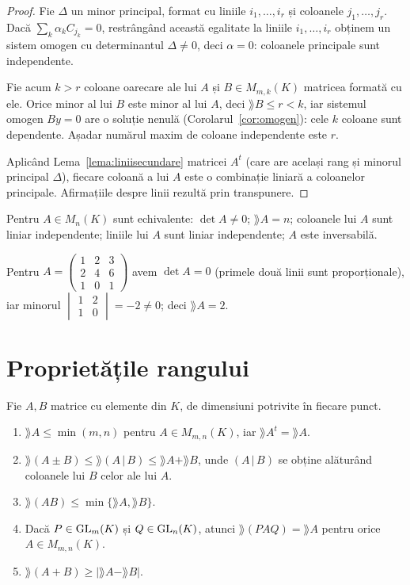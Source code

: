 \begin{proof}
Fie $\Delta$ un minor principal, format cu liniile $i_1,\dots,i_r$ și coloanele $j_1,\dots,j_r$. Dacă $\sum_k\alpha_kC_{j_k}=0$, restrângând această egalitate la liniile $i_1,\dots,i_r$ obținem un sistem omogen cu determinantul $\Delta\neq0$, deci $\alpha=0$: coloanele principale sunt independente.

Fie acum $k>r$ coloane oarecare ale lui $A$ și $B\in M_{m,k}(K)$ matricea formată cu ele. Orice minor al lui $B$ este minor al lui $A$, deci $\rang B\le r<k$, iar sistemul omogen $By=0$ are o soluție nenulă (Corolarul~\ref{cor:omogen}): cele $k$ coloane sunt dependente. Așadar numărul maxim de coloane independente este $r$.

Aplicând Lema~\ref{lema:liniisecundare} matricei $A^t$ (care are același rang și minorul principal $\Delta$), fiecare coloană a lui $A$ este o combinație liniară a coloanelor principale. Afirmațiile despre linii rezultă prin transpunere.
\end{proof}

\begin{corolar}\label{cor:detrang}
Pentru $A\in M_n(K)$ sunt echivalente: $\det A\neq0$; $\rang A=n$; coloanele lui $A$ sunt liniar independente; liniile lui $A$ sunt liniar independente; $A$ este inversabilă.
\end{corolar}

\begin{exemplu}
Pentru $A=\begin{pmatrix}1&2&3\\2&4&6\\1&0&1\end{pmatrix}$ avem $\det A=0$ (primele două linii sunt proporționale), iar minorul $\begin{vmatrix}1&2\\1&0\end{vmatrix}=-2\neq0$; deci $\rang A=2$.
\end{exemplu}

\section{Proprietățile rangului}

\begin{teorema}\label{teo:proprang}
Fie $A,B$ matrice cu elemente din $K$, de dimensiuni potrivite în fiecare punct.
\begin{enumerate}
\item $\rang A\le\min(m,n)$ pentru $A\in M_{m,n}(K)$, iar $\rang A^t=\rang A$.
\item $\rang(A\pm B)\le\rang(A\,|\,B)\le\rang A+\rang B$, unde $(A\,|\,B)$ se obține alăturând coloanele lui $B$ celor ale lui $A$.
\item $\rang(AB)\le\min\{\rang A,\rang B\}$.
\item Dacă $P\in\mathrm{GL}_m(K)$ și $Q\in\mathrm{GL}_n(K)$, atunci $\rang(PAQ)=\rang A$ pentru orice $A\in M_{m,n}(K)$.
\item $\rang(A+B)\ge\bigl|\rang A-\rang B\bigr|$.
\end{enumerate}
\end{teorema}

